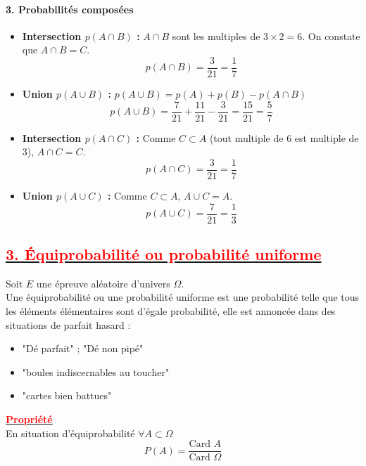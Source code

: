 \documentclass[12pt,a4paper]{article}
\begin{document}
\paragraph{3. Probabilités composées}

\begin{itemize}
    \item \textbf{Intersection $p(A \cap B)$ :}
    $A \cap B$ sont les multiples de $3 \times 2 = 6$. On constate que $A \cap B = C$.
    \[ p(A \cap B) = \frac{3}{21} = \frac{1}{7} \]

    \item \textbf{Union $p(A \cup B)$ :}
    $p(A \cup B) = p(A) + p(B) - p(A \cap B)$
    \[ p(A \cup B) = \frac{7}{21} + \frac{11}{21} - \frac{3}{21} = \frac{15}{21} = \frac{5}{7} \]

    \item \textbf{Intersection $p(A \cap C)$ :}
    Comme $C \subset A$ (tout multiple de 6 est multiple de 3), $A \cap C = C$.
    \[ p(A \cap C) = \frac{3}{21} = \frac{1}{7} \]

    \item \textbf{Union $p(A \cup C)$ :}
    Comme $C \subset A$, $A \cup C = A$.
    \[ p(A \cup C) = \frac{7}{21} = \frac{1}{3} \]
\end{itemize}

\subsection*{\underline{\textbf{\textcolor{red}{3. Équiprobabilité ou probabilité uniforme}}}}

Soit $E$ une épreuve aléatoire d'univers $\Omega$. \\
Une équiprobabilité ou une probabilité uniforme est une probabilité telle que tous les éléments élémentaires sont d'égale probabilité, elle est annoncée dans des situations de parfait hasard :
\begin{itemize}
    \item "Dé parfait" ; "Dé non pipé"
    \item "boules indiscernables au toucher"
    \item "cartes bien battues"
\end{itemize}

\underline{\textbf{\textcolor{red}{ Propriété }}}\\
En situation d'équiprobabilité $\forall A \subset \Omega$
\begin{equation*}
    \boxed{P(A) = \frac{\text{Card } A}{\text{Card } \Omega}}
\end{equation*}
\end{document}
